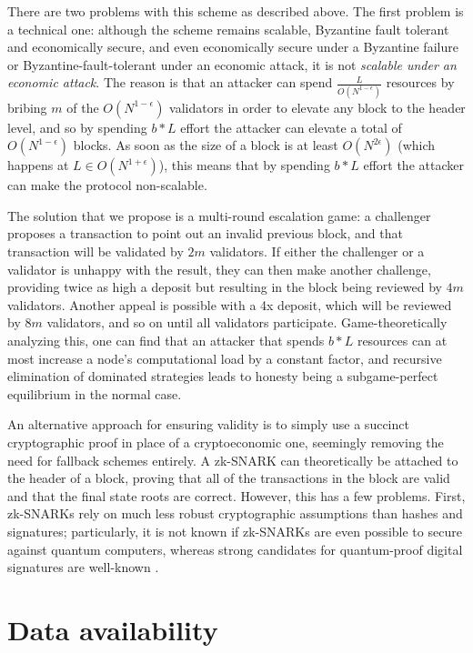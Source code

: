 \documentclass[11pt,a4paper]{report}
\theoremstyle{plain}
\theoremstyle{definition}
\theoremstyle{remark}
\begin{document}
There are two problems with this scheme as described above. The first problem is a technical one: although the scheme remains scalable, Byzantine fault tolerant and economically secure, and even economically secure under a Byzantine failure or Byzantine-fault-tolerant under an economic attack, it is not \emph{scalable under an economic attack}. The reason is that an attacker can spend $\frac{L}{O(N^{1-\epsilon})}$ resources by bribing $m$ of the $O(N^{1-\epsilon})$ validators in order to elevate any block to the header level, and so by spending $b * L$ effort the attacker can elevate a total of $O(N^{1-\epsilon})$ blocks. As soon as the size of a block is at least $O(N^{2\epsilon})$ (which happens at $L \in O(N^{1+\epsilon})$), this means that by spending $b * L$ effort the attacker can make the protocol non-scalable.

The solution that we propose is a multi-round escalation game: a challenger proposes a transaction to point out an invalid previous block, and that transaction will be validated by $2m$ validators. If either the challenger or a validator is unhappy with the result, they can then make another challenge, providing twice as high a deposit but resulting in the block being reviewed by $4m$ validators. Another appeal is possible with a 4x deposit, which will be reviewed by $8m$ validators, and so on until all validators participate. Game-theoretically analyzing this, one can find that an attacker that spends $b * L$ resources can at most increase a node's computational load by a constant factor, and recursive elimination of dominated strategies leads to honesty being a subgame-perfect equilibrium in the normal case.

An alternative approach for ensuring validity is to simply use a succinct cryptographic proof in place of a cryptoeconomic one, seemingly removing the need for fallback schemes entirely. A zk-SNARK can theoretically be attached to the header of a block, proving that all of the transactions in the block are valid and that the final state roots are correct. However, this has a few problems. First, zk-SNARKs rely on much less robust cryptographic assumptions than hashes and signatures; particularly, it is not known if zk-SNARKs are even possible to secure against quantum computers, whereas strong candidates for quantum-proof digital signatures are well-known \cite{ntrusign} \cite{hashladder} \cite{sphincs}.

\chapter{Data availability}
\end{document}
